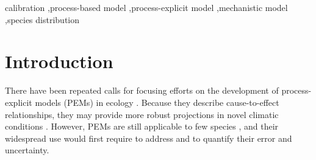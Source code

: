 \documentclass[preprint,12pt,authoryear]{elsarticle}
\begin{document}
\begin{frontmatter}


\begin{keyword}
calibration \sep process-based model \sep process-explicit model \sep mechanistic model \sep species distribution
\end{keyword}

\end{frontmatter}

\linenumbers

\clearpage
\section{Introduction}

There have been repeated calls for focusing efforts on the development of process-explicit models (PEMs) in ecology \citep{Urban2016, Singer2016, Pilowsky2022}. Because they describe cause-to-effect relationships, they may provide more robust projections in novel climatic conditions \citep{VanderMeersch2024}. However, PEMs are still applicable to few species \citep{Evans2016}, and their widespread use would first require to address and to quantify their error and uncertainty.
\end{document}
